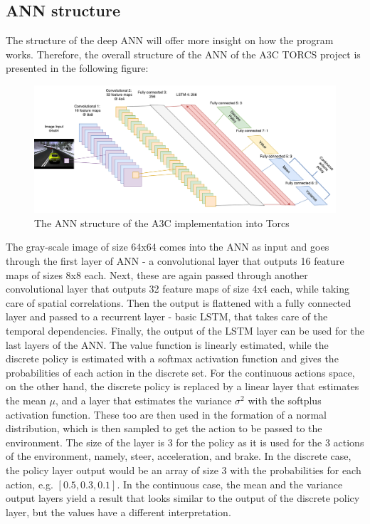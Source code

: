 \subsection{ANN structure}\label{ANNstructure}
The structure of the deep ANN will offer more insight on how the program works. Therefore, the overall structure of the ANN of the A3C TORCS project is presented in the following figure:
\begin{figure}[H]
	\centering
	\includegraphics[width=1.25\textwidth]{Figures/A3CTorcs}
	\caption{The ANN structure of the A3C implementation into Torcs}
	\label{A3CTorcs}
\end{figure}
The gray-scale image of size 64x64 comes into the ANN as input and goes through the first layer of ANN - a convolutional layer that outputs 16 feature maps of sizes 8x8 each. Next, these are again passed through another convolutional layer that outputs 32 feature maps of size 4x4 each, while taking care of spatial correlations. Then the output is flattened with a fully connected layer and passed to a recurrent layer - basic LSTM, that takes care of the temporal dependencies. Finally, the output of the LSTM layer can be used for the last layers of the ANN. The value function is linearly estimated, while the discrete policy is estimated with a softmax activation function and gives the probabilities of each action in the discrete set. For the continuous actions space, on the other hand, the discrete policy is replaced by a linear layer that estimates the mean $\mu$, and a layer that estimates the variance $\sigma^2$ with the softplus activation function. These too are then used in the formation of a normal distribution, which is then sampled to get the action to be passed to the environment. The size of the layer is 3 for the policy as it is used for the 3 actions of the environment, namely, steer, acceleration, and brake. In the discrete case, the policy layer output would be an array of size 3 with the probabilities for each action, e.g. $\left [ 0.5, 0.3, 0.1 \right ]$. In the continuous case, the mean and the variance output layers yield a result that looks similar to the output of the discrete policy layer, but the values have a different interpretation.

